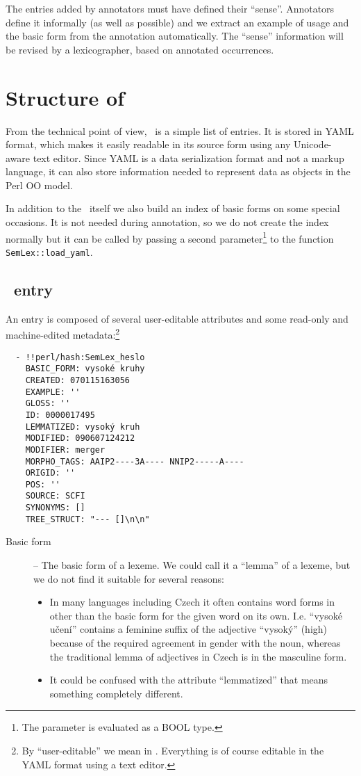 The entries added by annotators must have defined their ``sense''. Annotators define it informally (as well as possible) and we extract an example of usage and the basic form from the annotation automatically. The ``sense'' information will be revised by a lexicographer, based on annotated occurrences.


\section{Structure of \semlex}

From the technical point of view, \semlex\ is a simple list of entries. It is stored in YAML format, which makes it easily readable in its source form using any Unicode-aware text editor. Since YAML is a data serialization format and not a markup language, it can also store information needed to represent data as objects in the Perl OO model. 

In addition to the \semlex\ itself we also build an index of basic forms on some special occasions. It is not needed during annotation, so we do not create the index normally but it can be called by passing a second parameter\footnote{The parameter is evaluated as a BOOL type.} to the function \verb=SemLex::load_yaml=. 

\subsection{\semlex\ entry}
An entry is composed of several user-editable attributes and some read-only and machine-edited metadata:\footnote{By ``user-editable'' we mean in \seman. Everything is of course editable in the YAML format using a text editor.} 
\begin{verbatim}
  - !!perl/hash:SemLex_heslo 
    BASIC_FORM: vysoké kruhy
    CREATED: 070115163056
    EXAMPLE: ''
    GLOSS: ''
    ID: 0000017495
    LEMMATIZED: vysoký kruh
    MODIFIED: 090607124212
    MODIFIER: merger
    MORPHO_TAGS: AAIP2----3A---- NNIP2-----A----
    ORIGID: ''
    POS: ''
    SOURCE: SCFI
    SYNONYMS: []
    TREE_STRUCT: "--- []\n\n"
\end{verbatim}

\begin{description}
\item [Basic form] -- The basic form of a lexeme. We could call it a ``lemma'' of a lexeme, but we do not find it suitable for several reasons: 
  \begin{itemize}
    \item In many languages including Czech it often contains word forms in other than the basic form for the given word on its own. I.e. ``vysoké učení'' contains a feminine suffix of the adjective ``vysoký'' (high) because of the required agreement in gender with the noun, whereas the traditional lemma of adjectives in Czech is in the masculine form.
    \item  It could be confused with the attribute ``lemmatized'' that means something completely different.
  \end{itemize}
\end{description}



